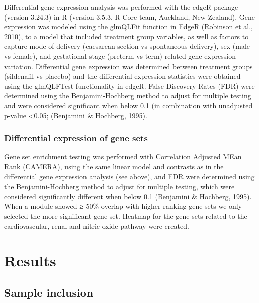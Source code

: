 \documentclass[authordate, empirical]{jote-new-article}
\begin{document}
Differential gene expression analysis was performed with the edgeR package (version 3.24.3) in R (version 3.5.3, R Core team, Auckland, New Zealand). Gene expression was modeled using the glmQLFit function in EdgeR (Robinson et al., 2010), to a model that included treatment group variables, as well as factors to capture mode of delivery (caesarean section vs spontaneous delivery), sex (male vs female), and gestational stage (preterm vs term) related gene expression variation. Differential gene expression was determined between treatment groups (sildenafil vs placebo) and the differential expression statistics were obtained using the glmQLFTest functionality in edgeR. False Discovery Rates (FDR) were determined using the Benjamini-Hochberg method to adjust for multiple testing and were considered significant when below 0.1 (in combination with unadjusted p-value <0.05; (Benjamini \& Hochberg, 1995).







\subsubsection{Differential expression of gene sets}



Gene set enrichment testing was performed with Correlation Adjusted MEan Rank (CAMERA), using the same linear model and contrasts as in the differential gene expression analysis (see above), and FDR were determined using the Benjamini-Hochberg method to adjust for multiple testing, which were considered significantly different when below 0.1 (Benjamini \& Hochberg, 1995). When a module showed ≥ 50\% overlap with higher ranking gene sets we only selected the more significant gene set. Heatmap for the gene sets related to the cardiovascular, renal and nitric oxide pathway were created.







\section{Results}







\subsection{Sample inclusion}
\end{document}
